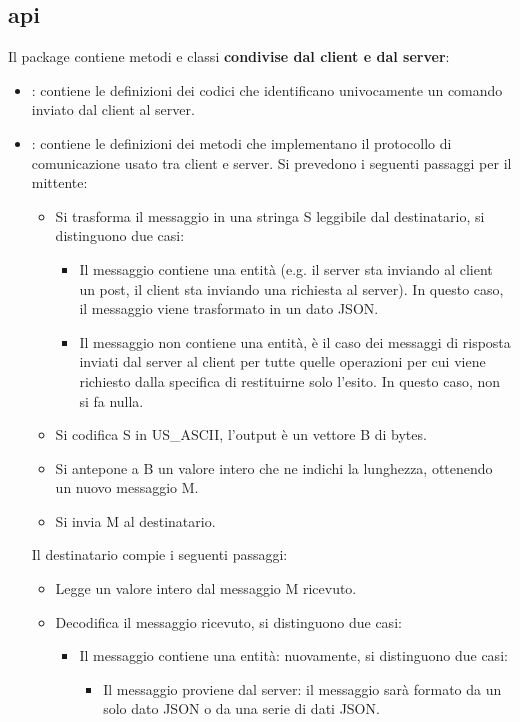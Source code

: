 \documentclass[11pt, italian, openany]{book}
\begin{document}
\begin{sloppypar}
\subsection*{api}
Il package contiene metodi e classi \textbf{condivise dal client e dal server}:
\begin{itemize}[itemsep=0pt, parsep=0pt, topsep=0pt]
	\item {}: contiene le definizioni dei codici che identificano univocamente un comando inviato dal client al server.
	\item {}: contiene le definizioni dei metodi che implementano il protocollo di comunicazione usato tra client e
	server. Si prevedono i seguenti passaggi per il mittente:
	\begin{itemize}
		\item Si trasforma il messaggio in una stringa S leggibile dal destinatario, si distinguono due casi:
		\begin{itemize}
			\item Il messaggio contiene una entit\`a (e.g. il server sta inviando al client un post, il client sta inviando una richiesta
			al server). In questo caso, il messaggio viene trasformato in un dato JSON.
			\item Il messaggio non contiene una entit\`a, \`e il caso dei messaggi di risposta inviati dal server al client per tutte
			quelle operazioni per cui viene richiesto dalla specifica di restituirne solo l'esito. In questo caso, non si fa nulla.
		\end{itemize}
		\item Si codifica S in US\_ASCII, l'output \`e un vettore B di bytes.
		\item Si antepone a B un valore intero che ne indichi la lunghezza, ottenendo un nuovo messaggio M.
		\item Si invia M al destinatario.
	\end{itemize}
	Il destinatario compie i seguenti passaggi:
	\begin{itemize}
		\item Legge un valore intero dal messaggio M ricevuto.
		\item Decodifica il messaggio ricevuto, si distinguono due casi:
		\begin{itemize}
			\item Il messaggio contiene una entit\`a: nuovamente, si distinguono due casi:
			\begin{itemize}
				\item Il messaggio proviene dal server: il messaggio sar\`a formato da un solo dato JSON o da una serie di dati JSON.

\end{itemize}
\end{itemize}
\end{itemize}
\end{itemize}
\end{sloppypar}
\end{document}

